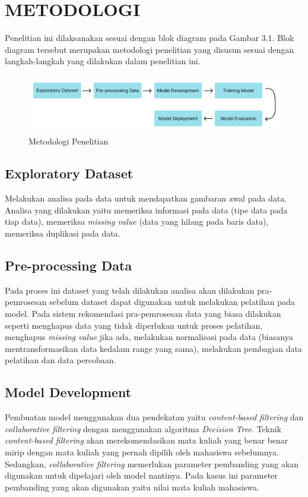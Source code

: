 \chapter{METODOLOGI}

Penelitian ini dilaksanakan sesuai dengan blok diagram pada Gambar 3.1. Blok diagram tersebut
merupakan metodologi penelitian yang disusun sesuai dengan langkah-langkah yang dilakukan dalam penelitian ini.

\begin{figure} [ht] \centering
  \includegraphics[width=160mm]{gambar/diagram-blok.png}
  \caption{Metodologi Penelitian}
\end{figure}


\section{Exploratory Dataset}
Melakukan analisa pada data untuk mendapatkan gambaran awal pada data. Analisa yang dilakukan yaitu
memeriksa informasi pada data (tipe data pada tiap data), memeriksa \emph{missing value} {(data yang hilang pada baris data)},
memeriksa duplikasi pada data.


\section{Pre-processing Data}
Pada proses ini dataset yang telah dilakukan analisa akan dilakukan pra-pemrosesan sebelum dataset dapat digunakan
untuk melakukan pelatihan pada model. Pada sistem rekomendasi pra-pemrosesan data yang biasa dilakukan seperti menghapus data
yang tidak diperlukan untuk proses pelatihan, menghapus \emph{missing value} jika ada, melakukan normalisasi pada data (biasanya mentransformasikan data kedalam range yang sama),
melakukan pembagian data pelatihan dan data percobaan.

\section{Model Development}
Pembuatan model menggunakan dua pendekatan yaitu \emph{content-based filtering} dan \emph{collaborative filtering} dengan menggunakan algoritma \emph{Decision Tree}. Teknik
\emph{content-based filtering} akan merekomendasikan mata kuliah yang benar benar mirip dengan mata kuliah yang pernah dipilih oleh mahasiswa sebelumnya. Sedangkan, \emph{collaborative filtering}
memerlukan parameter pembanding yang akan digunakan untuk dipelajari oleh model nantinya. Pada kasus ini parameter pembanding yang akan digunakan yaitu nilai mata kuliah mahasiswa.

